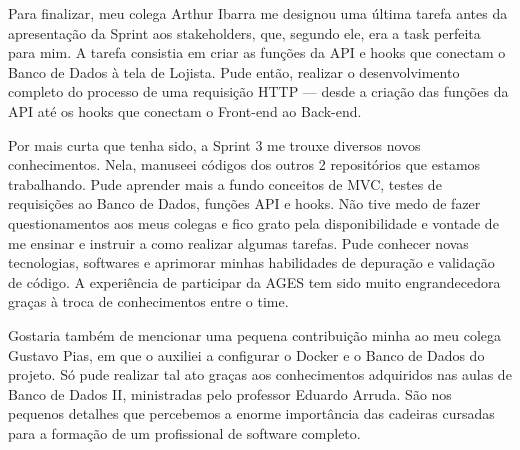 \indent \originaltab{}Para finalizar, meu colega Arthur Ibarra me designou uma última tarefa antes da apresentação da Sprint aos stakeholders, que, segundo ele, era a task perfeita para mim. A tarefa consistia em criar as funções da API e hooks que conectam o Banco de Dados à tela de Lojista. Pude então, realizar o desenvolvimento completo do processo de uma requisição HTTP — desde a criação das funções da API até os hooks que conectam o Front-end ao Back-end.

\begin{reflection}
\indent \originaltab{}Por mais curta que tenha sido, a Sprint 3 me trouxe diversos novos conhecimentos. Nela, manuseei códigos dos outros 2 repositórios que estamos trabalhando. Pude aprender mais a fundo conceitos de MVC, testes de requisições ao Banco de Dados, funções API e hooks. Não tive medo de fazer questionamentos aos meus colegas e fico grato pela disponibilidade e vontade de me ensinar e instruir a como realizar algumas tarefas. Pude conhecer novas tecnologias, softwares e aprimorar minhas habilidades de depuração e validação de código. A experiência de participar da AGES tem sido muito engrandecedora graças à troca de conhecimentos entre o time.\originalspace{}

\indent \originaltab{}Gostaria também de mencionar uma pequena contribuição minha ao meu colega Gustavo Pias, em que o auxiliei a configurar o Docker e o Banco de Dados do projeto. Só pude realizar tal ato graças aos conhecimentos adquiridos nas aulas de Banco de Dados II, ministradas pelo professor Eduardo Arruda. São nos pequenos detalhes que percebemos a enorme importância das cadeiras cursadas para a formação de um profissional de software completo.\originalspace{}

\end{reflection}
